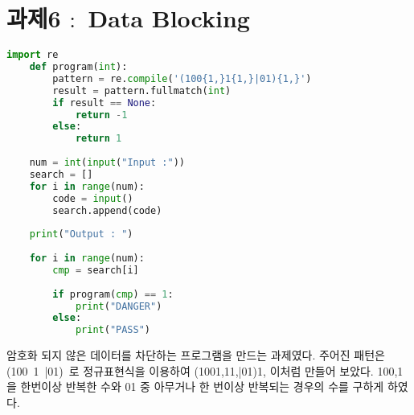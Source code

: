 \documentclass[letterpaper, 10 pt, conference]{ieeeconf}
\begin{document}
\section{과제6 $:$ Data Blocking}

\begin{lstlisting}[language=python]
    import re
    def program(int):
        pattern = re.compile('(100{1,}1{1,}|01){1,}')
        result = pattern.fullmatch(int)
        if result == None:
            return -1
        else:
            return 1
    
    num = int(input("Input :"))
    search = []
    for i in range(num):
        code = input()
        search.append(code)
    
    print("Output : ")
    
    for i in range(num):
        cmp = search[i]
    
        if program(cmp) == 1:
            print("DANGER")
        else:
            print("PASS")
\end{lstlisting}
\small 암호화 되지 않은 데이터를 차단하는 프로그램을 만드는 과제였다. 주어진 패턴은 (100~1~|01)~로 정규표현식을 이용하여 (100{1,}1{1,}|01){1,} 이처럼 만들어 보았다. 100,1을 한번이상 반복한 수와 01 중 아무거나 한 번이상 반복되는 경우의 수를 구하게 하였다.
\end{document}
